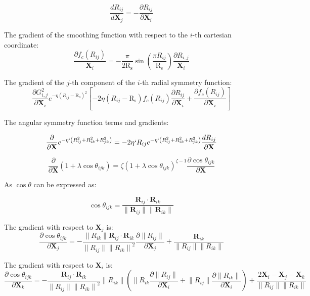 \documentclass{article}
\newcommand{\mb}[1]{\mathbf{#1}}
\begin{document}
\begin{equation}
\frac{d R_{ij}}{d \mb{X}_{j}} = - \frac{\partial R_{ij}}{\partial\mb{X}_{i}}
\end{equation}

The gradient of the smoothing function with respect to the ${i}$-th cartesian coordinate:
\begin{equation}
\frac{\partial f_c (R_{ij}) } { \mb{X}_{i}} = -\frac{\pi}{2 
 \mathrm{R_s}}  \sin ( \frac{\pi R_{ij}}{\mathrm{R_s}}) \frac{\partial R_{i,j}}{\mb{X}_{i}}
\end{equation}

The gradient of the $j$-th component of the $i$-th radial symmetry function:
\begin{equation}
\frac{\partial G_{i,j}^2 } { \partial \mb{X}_i} e^{-\eta ( R_{ij} - \mathrm{R_s} )^2} \left[ -2 \eta ( R_{ij} - \mathrm{R_s} )  f_c (R_{ij}) \frac{\partial R_{ij}}{\partial  \mb{X}_i} + \frac{\partial f_c ( R_{ij} )}{\partial \mb{X}_i} \right] 
\end{equation}

The angular symmetry function terms and gradients:

\begin{equation}
\frac{\partial } {\partial \mb{X}}
 e^{-\eta ` \left( R_{ij}^2 + R_{ik}^2 + R_{jk}^2 \right) } =
  -2 \eta` R_{ij} e^{-\eta` \left( R_{ij}^2 + R_{ik}^2 + R_{jk}^2 \right) }
\frac{d R_{ij}}{\partial \mb{X}}
\end{equation}

\begin{equation}
\frac{\partial } {\partial \mb{X}} ( 1 + \lambda \cos{\theta_{ijk}} )  = \zeta ( 1 + \lambda \cos \theta_{ijk} ) ^ {\zeta - 1} \frac{\partial \cos \theta_{ijk} } {\partial \mb{X}}
\end{equation}

As $\cos \theta$ can be expressed as:

\begin{equation}
\cos \theta_{ijk} = \frac{\mb{R}_{ij} \cdot  \mb{R}_{ik}} { \lVert \mb{R}_{ij} \rVert \lVert \mb{R}_{ik} \rVert}
\end{equation}

The gradient with respect to $\mb{X}_j$ is:
\begin{equation}
\frac{\partial \cos \theta_{ijk} } {\partial \mb{X}_j} = - \frac{\lVert R_{ik} \rVert \mb{R}_{ij} \cdot \mathbf{R}_{ik}  } { {\lVert R_{ij} \rVert \lVert R_{ik} \rVert } ^ 2 } \frac{\partial \lVert R_{ij} \rVert } {\partial \mb{X}_j} + \frac{\mb{R}_{ik}} { \lVert R_{ij} \rVert \lVert R_{ik} \rVert }
\end{equation}

The gradient with respect to $\mb{X}_i$ is:
\begin{equation}
\frac{\partial \cos \theta_{ijk} } {\partial \mb{X}_k} = -\frac{\mb{R}_{ij} \cdot \mathbf{R}_{ik}  }{ {\lVert R_{ij} \rVert \lVert R_{ik} \rVert } ^ 2} \lVert R_{ik} \rVert 
\left( \lVert R_{ik} \frac{\partial \lVert R_{ij} \rVert } {\partial \mb{X}_i} + \lVert R_{ij} \rVert \frac{\partial \lVert R_{ik} \rVert } {\partial \mb{X}_i} \right) + \frac{ 2\mb{X}_i - \mb{X}_j - \mb{X}_k} { \lVert R_{ij} \rVert \lVert R_{ik} \rVert }
\end{equation}
\end{document}
